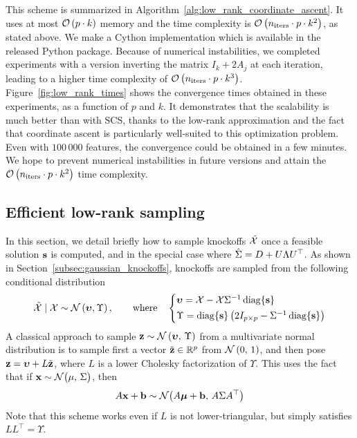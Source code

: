 This scheme is summarized in Algorithm~\ref{alg:low_rank_coordinate_ascent}.
It uses at most $\mathcal{O}\left( p \cdot k \right)$ memory
and the time complexity is $\mathcal{O}\left( n_\text{iters} \cdot p \cdot k^2 \right)$, as stated above.
We make a Cython implementation which is available in the released Python package.
Because of numerical instabilities, we completed experiments with a version inverting the matrix
$I_k + 2A_j$ at each iteration, leading to a higher time complexity of
$\mathcal{O}\left( n_\text{iters} \cdot p \cdot k^3 \right)$.
Figure~\ref{fig:low_rank_times} shows the convergence times obtained in these experiments,
as a function of $p$ and $k$.
It demonstrates that the scalability is much better than with SCS,
thanks to the low-rank approximation and the fact that coordinate ascent
is particularly well-suited to this optimization problem.
Even with $100\,000$ features, the convergence could be obtained in a few minutes.
We hope to prevent numerical instabilities in future versions and attain the
$\mathcal{O}\left( n_\text{iters} \cdot p \cdot k^2 \right)$ time complexity.

\subsection{Efficient low-rank sampling}\label{subsec:low_rank_sampling}

In this section, we detail briefly how to sample knockoffs $\tilde{\mathcal{X}}$ once
a feasible solution $\mathbf{s}$ is computed,
and in the special case where $\hat{\Sigma} = D + U\Lambda U^\top$.
As shown in Section~\ref{subsec:gaussian_knockoffs},
knockoffs are sampled from the following conditional distribution
\begin{equation}\label{eq:conditional_gaussian_knockoffs3}
    \tcX \mid \cX \sim \cN\left( \bupsilon, \Upsilon \right)
    ,\qquad\text{where}\quad
    \begin{cases*}
        \bupsilon = \cX - \cX\Sigma^{-1}\diag\{ \bs \}\\
        \Upsilon = \diag\{ \bs \}\left( 2I_{p \times p} - \Sigma^{-1}\diag\{ \bs \} \right)
    \end{cases*}
\end{equation}
A classical approach to sample
$\mathbf{z} \sim \mathcal{N}\left( \bm{\upsilon},\, \Upsilon \right)$
from a multivariate normal distribution is to sample first a vector
$\tilde{\mathbf{z}} \in \mathbb{R}^p$ from $\mathcal{N}\left( 0,\, 1 \right)$,
and then pose $\mathbf{z} = \bm{\upsilon} + L\tilde{\mathbf{z}}$,
where $L$ is a lower Cholesky factorization of $\Upsilon$.
This uses the fact that if $\mathbf{x} \sim \mathcal{N}\big( \mu,\, \Sigma \big)$,
then
\begin{equation}\label{eq:affine_transformation}
    A\mathbf{x} + \mathbf{b} \sim \mathcal{N}\big( A\bm{\mu} + \mathbf{b},\, A\Sigma A^\top \big)
\end{equation}
Note that this scheme works even if $L$ is not lower-triangular,
but simply satisfies $LL^\top = \Upsilon$.

